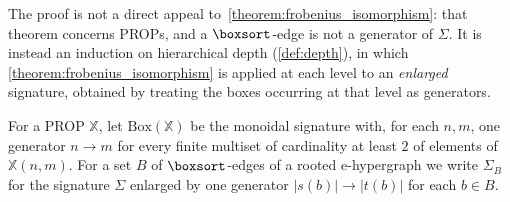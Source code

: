 The proof is not a direct appeal to~\cref{theorem:frobenius_isomorphism}: that theorem
concerns PROPs, and a $\boxsort$-edge is not a generator of $\Sigma$.
It is instead an induction on hierarchical depth (\cref{def:depth}), in which
\cref{theorem:frobenius_isomorphism} is applied at each level to an \emph{enlarged}
signature, obtained by treating the boxes occurring at that level as generators.

\begin{definition}\label{def:box_signature}
For a PROP $\mathbb{X}$, let $\mathrm{Box}(\mathbb{X})$ be the monoidal signature with, for
each $n, m$, one generator $n \to m$ for every finite multiset of cardinality at least $2$
of elements of $\mathbb{X}(n,m)$.
For a set $B$ of $\boxsort$-edges of a rooted e-hypergraph we write $\Sigma_{B}$ for the
signature $\Sigma$ enlarged by one generator $|s(b)| \to |t(b)|$ for each $b \in B$.
\end{definition}

